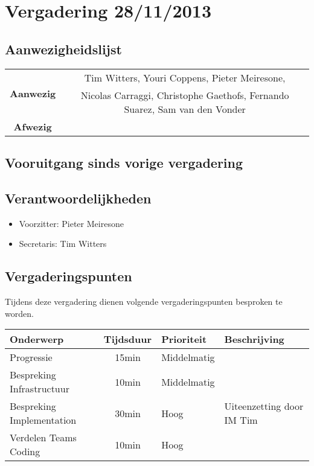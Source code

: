 \section{Vergadering 28/11/2013}
\subsection{Aanwezigheidslijst}
\begin{table}[htbp]
	\centering
	\begin{tabular}{c|c}
		\multirow{2}{*}{\textbf{Aanwezig}} & Tim Witters, Youri Coppens, Pieter Meiresone, \\
		& Nicolas Carraggi,  Christophe Gaethofs, Fernando Suarez, Sam van den Vonder \\
		\hline
		\textbf{Afwezig} & \\
	\end{tabular}
\end{table}

\subsection{Vooruitgang sinds vorige vergadering}


\subsection{Verantwoordelijkheden}
\begin{itemize}
	\item Voorzitter: Pieter Meiresone
	\item Secretaris: Tim Witters
\end{itemize}
\subsection{Vergaderingspunten}

Tijdens deze vergadering dienen volgende vergaderingspunten besproken te worden.
\begin{table} [H]
	\centering
	\begin{tabular} {l|cll}
		\textbf{Onderwerp} & \textbf{Tijdsduur} & \textbf{Prioriteit} & \textbf{Beschrijving} \\ %
		\hline
		Progressie & 15min & Middelmatig & \\
		Bespreking Infrastructuur & 10min & Middelmatig & \\
		Bespreking Implementation & 30min & Hoog & Uiteenzetting door IM Tim \\
		Verdelen Teams Coding & 10min & Hoog & \\
	\end{tabular}
\end{table}



